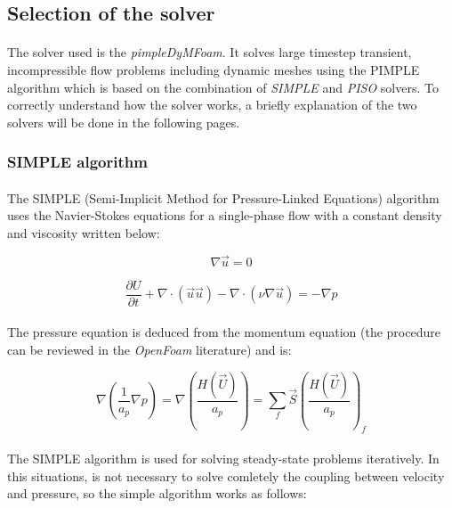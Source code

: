 \subsection{Selection of the solver}

\paragraph{}The solver used is the \textit{pimpleDyMFoam}. It solves large timestep transient, incompressible flow problems including dynamic meshes using the PIMPLE algorithm which is based on the combination of \emph{SIMPLE} and \emph{PISO} solvers. To correctly understand how the solver works, a briefly explanation of the two solvers will be done in the following pages.

\subsubsection{SIMPLE algorithm}


\paragraph{}The SIMPLE (Semi-Implicit Method for Pressure-Linked Equations) algorithm uses the Navier-Stokes equations for a single-phase flow with a constant density and viscosity written below:

\begin{equation}
\nabla \vec{u} = 0
\end{equation}

\begin{equation}
\frac{\partial U}{\partial t} + \nabla ·(\vec{u}\vec{u}) -\nabla·(\nu\nabla\vec{u})= -\nabla p
\end{equation}

\paragraph{}The pressure equation is deduced from the momentum equation (the procedure can be reviewed in the \textit{OpenFoam} literature) and is:

\begin{equation}
\nabla\left(\frac{1}{a_p}\nabla p \right )=\nabla\left(\frac{H(\vec{U})}{a_p}\right )=\sum_{f}\vec{S}\left(\frac{H(\vec{U})}{a_p}\right )_f
\end{equation}

\paragraph{}The SIMPLE algorithm is used for solving steady-state problems iteratively. In this situations, is not necessary to solve comletely the coupling between velocity and pressure, so the simple algorithm works as follows:

